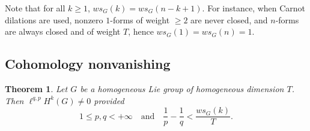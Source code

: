 \documentclass[11pt]{article}
\newtheorem{theo}{Theorem}[section]
\theoremstyle{definition}
\numberwithin{equation}{section}
\numberwithin{figure}{section}
\numberwithin{table}{section}
\begin{document}
Note that for all $k\geq 1$, $ws_G(k)=ws_G(n-k+1)$. For instance, when Carnot dilations are used, nonzero $1$-forms of weight $\geq 2$ are never closed, and $n$-forms are always closed and of weight $T$, hence $ws_G(1)=ws_G(n)=1$.

\subsection{Cohomology nonvanishing}

\begin{theo}\label{thm:nonzero}
Let $G$ be a homogeneous Lie group of homogeneous dimension $T$. Then $\ell^{q,p}H^k(G)\not=0$ provided
\[
1\leq p,q<+\infty \quad \text{and} \quad
\frac{1}{p}-\frac{1}{q}<\frac{ws_G(k)}{T}.
\]
\end{theo}
\end{document}
